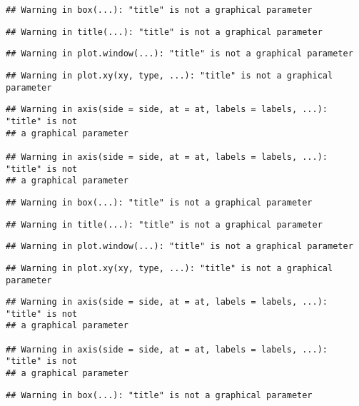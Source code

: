 \documentclass[]{article}
\begin{document}
\begin{verbatim}
## Warning in box(...): "title" is not a graphical parameter
\end{verbatim}

\begin{verbatim}
## Warning in title(...): "title" is not a graphical parameter
\end{verbatim}

\begin{verbatim}
## Warning in plot.window(...): "title" is not a graphical parameter
\end{verbatim}

\begin{verbatim}
## Warning in plot.xy(xy, type, ...): "title" is not a graphical parameter
\end{verbatim}

\begin{verbatim}
## Warning in axis(side = side, at = at, labels = labels, ...): "title" is not
## a graphical parameter

## Warning in axis(side = side, at = at, labels = labels, ...): "title" is not
## a graphical parameter
\end{verbatim}

\begin{verbatim}
## Warning in box(...): "title" is not a graphical parameter
\end{verbatim}

\begin{verbatim}
## Warning in title(...): "title" is not a graphical parameter
\end{verbatim}

\begin{verbatim}
## Warning in plot.window(...): "title" is not a graphical parameter
\end{verbatim}

\begin{verbatim}
## Warning in plot.xy(xy, type, ...): "title" is not a graphical parameter
\end{verbatim}

\begin{verbatim}
## Warning in axis(side = side, at = at, labels = labels, ...): "title" is not
## a graphical parameter

## Warning in axis(side = side, at = at, labels = labels, ...): "title" is not
## a graphical parameter
\end{verbatim}

\begin{verbatim}
## Warning in box(...): "title" is not a graphical parameter
\end{verbatim}
\end{document}
